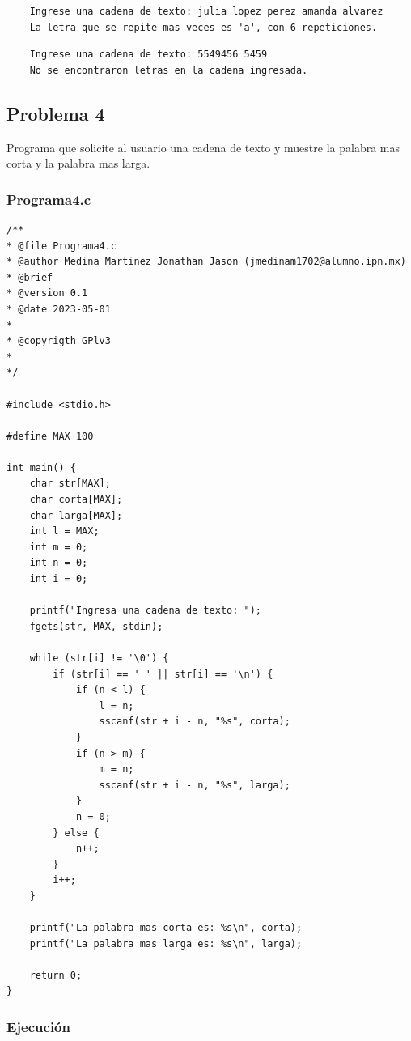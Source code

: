 \documentclass{article}
\begin{document}
	\begin{lstlisting}
	Ingrese una cadena de texto: julia lopez perez amanda alvarez
	La letra que se repite mas veces es 'a', con 6 repeticiones.
	\end{lstlisting}
	
	\begin{lstlisting}
	Ingrese una cadena de texto: 5549456 5459
	No se encontraron letras en la cadena ingresada.
	\end{lstlisting}
	
	\newpage
	
	\subsection{Problema 4}
	
	Programa que solicite al usuario una cadena de texto y muestre la palabra mas corta y la palabra mas larga.
	
	\subsubsection{Programa4.c}
	
	\begin{lstlisting}
/**
* @file Programa4.c
* @author Medina Martinez Jonathan Jason (jmedinam1702@alumno.ipn.mx)
* @brief 
* @version 0.1
* @date 2023-05-01
* 
* @copyrigth GPlv3
* 
*/

#include <stdio.h>

#define MAX 100

int main() {
	char str[MAX];
	char corta[MAX];
	char larga[MAX];
	int l = MAX;
	int m = 0;
	int n = 0;
	int i = 0;
	
	printf("Ingresa una cadena de texto: ");
	fgets(str, MAX, stdin);
	
	while (str[i] != '\0') {
		if (str[i] == ' ' || str[i] == '\n') {
			if (n < l) {
				l = n;
				sscanf(str + i - n, "%s", corta);
			}
			if (n > m) {
				m = n;
				sscanf(str + i - n, "%s", larga);
			}
			n = 0;
		} else {
			n++;
		}
		i++;
	}
	
	printf("La palabra mas corta es: %s\n", corta);
	printf("La palabra mas larga es: %s\n", larga);
	
	return 0;
}

	\end{lstlisting}
	
	\subsubsection{Ejecución}
	
\end{document}
